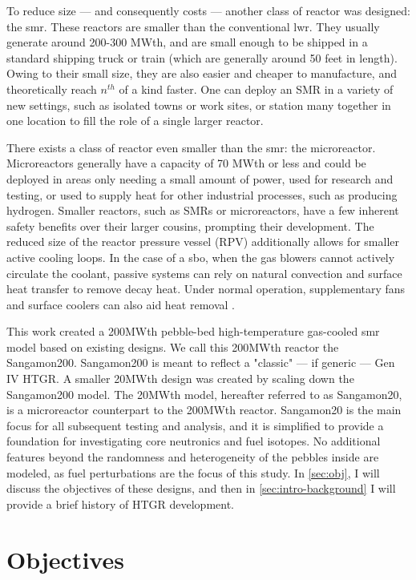 To reduce size --- and consequently costs --- another class of reactor was designed: the \acrfull{smr}.  These reactors are smaller than the conventional \acrshort{lwr}.  They usually generate around 200-300 MWth, and are small enough to be shipped in a standard shipping truck or train (which are generally around 50 feet in length).  Owing to their small size, they are also easier and cheaper to manufacture, and theoretically reach $n^{th}$ of a kind faster.  One can deploy an SMR in a variety of new settings, such as isolated towns or work sites, or station many together in one location to fill the role of a single larger reactor.  

There exists a class of reactor even smaller than the \acrshort{smr}: the microreactor.  Microreactors generally have a capacity of 70 MWth or less and could be deployed in areas only needing a small amount of power, used for research and testing, or used to supply heat for other industrial processes, such as producing hydrogen.  Smaller reactors, such as SMRs or microreactors, have a few inherent safety benefits over their larger cousins, prompting their development.  The reduced size of the reactor pressure vessel (RPV) additionally allows for smaller active cooling loops.  In the case of a \acrfull{sbo}, when the gas blowers cannot actively circulate the coolant, passive systems can rely on natural convection and surface heat transfer to remove decay heat.  Under normal operation, supplementary fans and surface coolers can also aid heat removal \cite{reutler_advantages_1984}.


This work created a 200MWth pebble-bed high-temperature gas-cooled \acrshort{smr} model based on existing designs.  We call this 200MWth reactor the Sangamon200.  Sangamon200 is meant to reflect a "classic" --- if generic --- Gen IV HTGR.  A smaller 20MWth design was created by scaling down the Sangamon200 model.  The 20MWth model, hereafter referred to as Sangamon20, is a microreactor counterpart to the 200MWth reactor.  Sangamon20 is the main focus for all subsequent testing and analysis, and it is simplified to provide a foundation for investigating core neutronics and fuel isotopes. No additional features beyond the randomness and heterogeneity of the pebbles inside are modeled, as fuel perturbations are the focus of this study.  In \autoref{sec:obj}, I will discuss the objectives of these designs, and then in \autoref{sec:intro-background} I will provide a brief history of HTGR development.


\section{Objectives}
\label{sec:obj}

